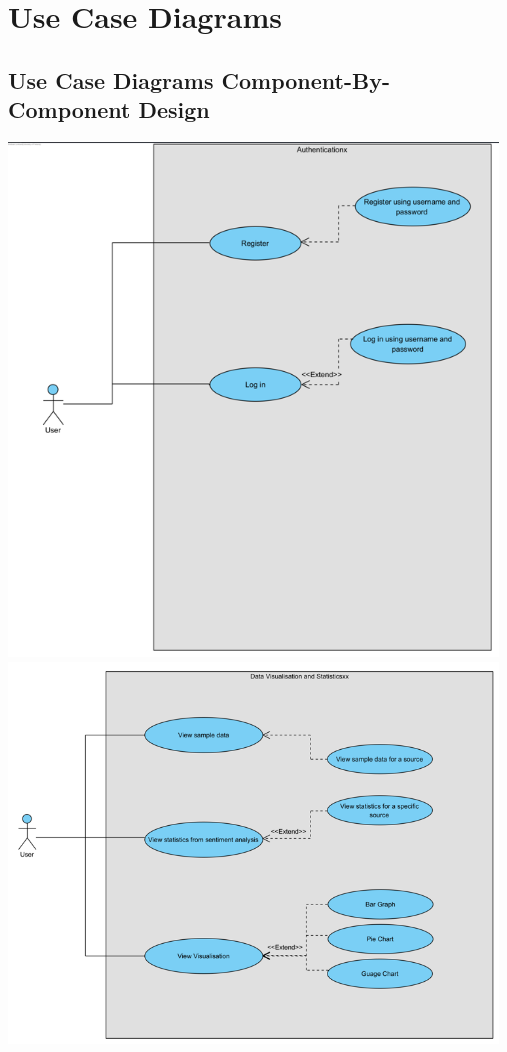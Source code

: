 \documentclass[12pt]{article}
\begin{document}
\newpage
\section{Use Case Diagrams}

\subsection{Use Case Diagrams Component-By-Component Design}
\begin{center}
  \includegraphics[width=13cm]{../../Images/UC2.2.1.png}
  \includegraphics[width=13cm]{../../Images/UC2.2.2.png}

\end{center}
\end{document}

